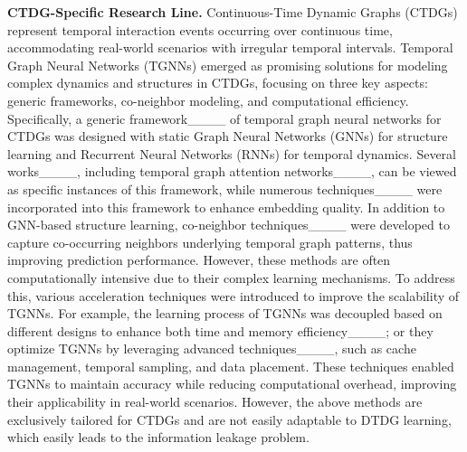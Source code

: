 \noindent\textbf{CTDG-Specific Research Line.} Continuous-Time Dynamic Graphs (CTDGs) represent temporal interaction events occurring over continuous time, accommodating real-world scenarios with irregular temporal intervals. Temporal Graph Neural Networks (TGNNs) emerged as promising solutions for modeling complex dynamics and structures in CTDGs, focusing on three key aspects: generic frameworks, co-neighbor modeling, and computational efficiency. Specifically, a generic framework____ of temporal graph neural networks for CTDGs was designed with static Graph Neural Networks (GNNs) for structure learning and Recurrent Neural Networks (RNNs) for temporal dynamics. Several works____, including temporal graph attention networks____, can be viewed as specific instances of this framework, while numerous techniques____ were incorporated into this framework to enhance embedding quality. In addition to GNN-based structure learning, co-neighbor techniques____ were developed to capture co-occurring neighbors underlying temporal graph patterns, thus improving prediction performance. However, these methods are often computationally intensive due to their complex learning mechanisms. To address this, various acceleration techniques were introduced to improve the scalability of TGNNs. For example, the learning process of TGNNs was decoupled based on different designs to enhance both time and memory efficiency____; or they optimize TGNNs by leveraging advanced techniques____, such as cache management, temporal sampling, and data placement. These techniques enabled TGNNs to maintain accuracy while reducing computational overhead, improving their applicability in real-world scenarios. However, the above methods are exclusively tailored for CTDGs and are not easily adaptable to DTDG learning, which easily leads to the information leakage problem.




